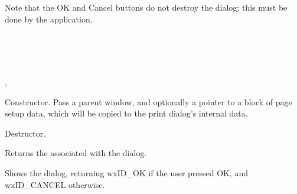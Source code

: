 Note that the OK and Cancel buttons do not destroy the dialog; this must be done by the
application.


\\
\\
\\


, 




Constructor. Pass a parent window, and optionally a pointer to a block of page setup
data, which will be copied to the print dialog's internal data.



Destructor.

\label{wxpagesetupdialoggetpagesetupdata}


Returns the  associated with the dialog.

\label{wxpagesetupdialogshowmodal}


Shows the dialog, returning wxID\_OK if the user pressed OK, and wxID\_CANCEL
otherwise.


